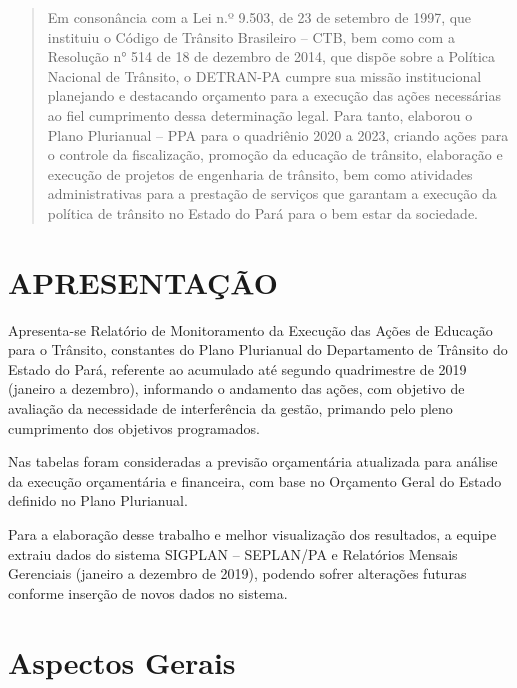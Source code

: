 \documentclass[a4paper]{article}
\begin{document}
\newpage

\begin{abstract}
 Em consonância com a Lei n.º 9.503, de 23 de setembro de 1997, que instituiu o 
Código de Trânsito Brasileiro – CTB, bem como com a Resolução n° 514 de 18 de dezembro 
de 2014, que dispõe sobre a Política Nacional de Trânsito, o DETRAN-PA cumpre sua missão 
institucional planejando e destacando orçamento para a execução das ações necessárias ao 
fiel cumprimento dessa determinação legal. Para tanto, elaborou o Plano Plurianual – PPA 
para o quadriênio 2020 a 2023, criando ações para o controle da fiscalização, promoção da 
educação de trânsito, elaboração e execução de projetos de engenharia de trânsito, bem 
como atividades administrativas para a prestação de serviços que garantam a execução da 
política de trânsito no Estado do Pará para o bem estar da sociedade.  
\end{abstract}

\newpage



\newpage
\section{APRESENTAÇÃO}

Apresenta-se Relatório de Monitoramento da Execução das Ações de Educação para o Trânsito, constantes do Plano Plurianual do Departamento de Trânsito do Estado do Pará, referente ao acumulado até segundo quadrimestre de 2019 (janeiro a dezembro), informando o andamento das ações, com objetivo de avaliação da necessidade de interferência da gestão, primando pelo pleno cumprimento dos objetivos programados.\vskip0.3cm

Nas tabelas foram consideradas a previsão orçamentária atualizada para análise da execução orçamentária e financeira, com base no Orçamento Geral do Estado definido no Plano Plurianual.\vskip0.3cm

Para a elaboração desse trabalho e melhor visualização dos resultados, a equipe extraiu dados do sistema SIGPLAN – SEPLAN/PA e Relatórios Mensais Gerenciais (janeiro a dezembro de 2019), podendo sofrer alterações futuras conforme inserção de novos dados no sistema.\vskip0.3cm



\newpage
\section{Aspectos Gerais}
\end{document}
